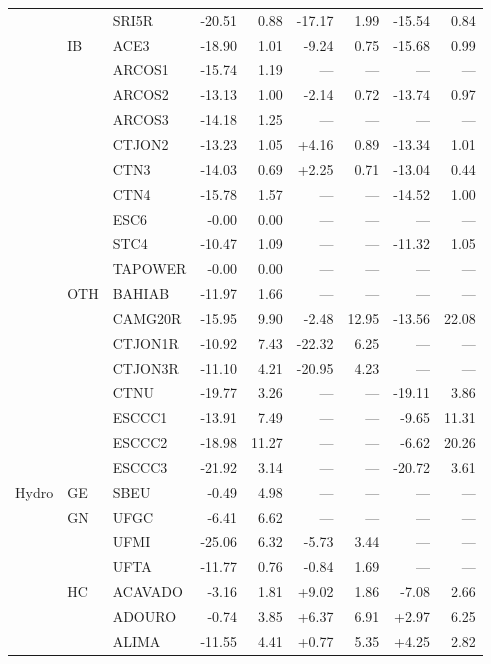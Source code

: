 \begin{tabular}{l l l r r r r r r}
 &  & SRI5R & -20.51 & 0.88 & -17.17 & 1.99 & -15.54 & 0.84 \\
 & IB & ACE3 & -18.90 & 1.01 & -9.24 & 0.75 & -15.68 & 0.99 \\
 &  & ARCOS1 & -15.74 & 1.19 & --- & --- & --- & --- \\
 &  & ARCOS2 & -13.13 & 1.00 & -2.14 & 0.72 & -13.74 & 0.97 \\
 &  & ARCOS3 & -14.18 & 1.25 & --- & --- & --- & --- \\
 &  & CTJON2 & -13.23 & 1.05 & +4.16 & 0.89 & -13.34 & 1.01 \\
 &  & CTN3 & -14.03 & 0.69 & +2.25 & 0.71 & -13.04 & 0.44 \\
 &  & CTN4 & -15.78 & 1.57 & --- & --- & -14.52 & 1.00 \\
 &  & ESC6 & -0.00 & 0.00 & --- & --- & --- & --- \\
 &  & STC4 & -10.47 & 1.09 & --- & --- & -11.32 & 1.05 \\
 &  & TAPOWER & -0.00 & 0.00 & --- & --- & --- & --- \\
 & OTH & BAHIAB & -11.97 & 1.66 & --- & --- & --- & --- \\
 &  & CAMG20R & -15.95 & 9.90 & -2.48 & 12.95 & -13.56 & 22.08 \\
 &  & CTJON1R & -10.92 & 7.43 & -22.32 & 6.25 & --- & --- \\
 &  & CTJON3R & -11.10 & 4.21 & -20.95 & 4.23 & --- & --- \\
 &  & CTNU & -19.77 & 3.26 & --- & --- & -19.11 & 3.86 \\
 &  & ESCCC1 & -13.91 & 7.49 & --- & --- & -9.65 & 11.31 \\
 &  & ESCCC2 & -18.98 & 11.27 & --- & --- & -6.62 & 20.26 \\
 &  & ESCCC3 & -21.92 & 3.14 & --- & --- & -20.72 & 3.61 \\
\addlinespace
Hydro & GE & SBEU & -0.49 & 4.98 & --- & --- & --- & --- \\
 & GN & UFGC & -6.41 & 6.62 & --- & --- & --- & --- \\
 &  & UFMI & -25.06 & 6.32 & -5.73 & 3.44 & --- & --- \\
 &  & UFTA & -11.77 & 0.76 & -0.84 & 1.69 & --- & --- \\
 & HC & ACAVADO & -3.16 & 1.81 & +9.02 & 1.86 & -7.08 & 2.66 \\
 &  & ADOURO & -0.74 & 3.85 & +6.37 & 6.91 & +2.97 & 6.25 \\
 &  & ALIMA & -11.55 & 4.41 & +0.77 & 5.35 & +4.25 & 2.82 \\

\end{tabular}
